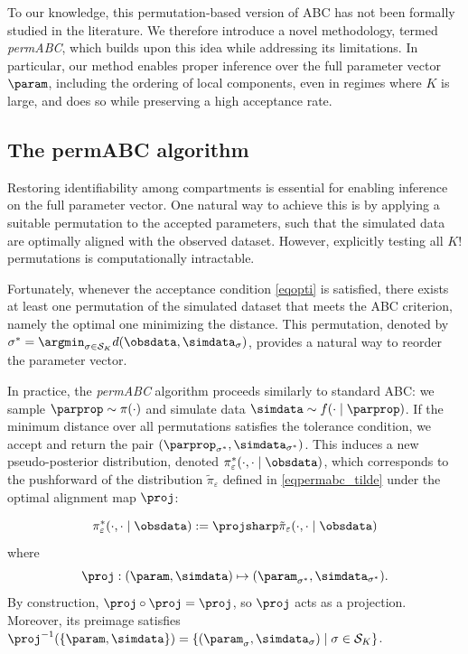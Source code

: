 To our knowledge, this permutation-based version of ABC has not been formally studied in the literature. We therefore introduce a novel methodology, termed \emph{permABC}, which builds upon this idea while addressing its limitations. In particular, our method enables proper inference over the full parameter vector \( \param \), including the ordering of local components, even in regimes where \( K \) is large, and does so while preserving a high acceptance rate.

\subsection{The permABC algorithm}
\label{secpermabc_star}


Restoring identifiability among compartments is essential for enabling inference on the full parameter vector. One natural way to achieve this is by applying a suitable permutation to the accepted parameters, such that the simulated data are optimally aligned with the observed dataset. However, explicitly testing all \( K! \) permutations is computationally intractable.

Fortunately, whenever the acceptance condition \eqref{eqopti} is satisfied, there exists at least one permutation of the simulated dataset that meets the ABC criterion, namely the optimal one minimizing the distance. This permutation, denoted by \( \sigma^* = \argmin_{\sigma \in \mathcal{S}_K} d(\obsdata, \simdata_{\sigma}) \), provides a natural way to reorder the parameter vector.

In practice, the \emph{permABC} algorithm proceeds similarly to standard ABC: we sample \( \parprop \sim \pi(\cdot) \) and simulate data \( \simdata \sim f(\cdot \mid \parprop) \). If the minimum distance over all permutations satisfies the tolerance condition, we accept and return the pair \( (\parprop_{\sigma^*}, \simdata_{\sigma^*}) \). This induces a new pseudo-posterior distribution, denoted \( \pi_{\varepsilon}^*(\cdot, \cdot \mid \obsdata) \), which corresponds to the pushforward of the distribution \( \tilde{\pi}_\varepsilon \) defined in \eqref{eqpermabc_tilde} under the optimal alignment map \( \proj \):

\begin{equation}
\label{eqproj}
\pi^{*}_{\varepsilon}(\cdot, \cdot \mid \obsdata)
:= \projsharp \tilde{\pi}_{\varepsilon}(\cdot, \cdot \mid \obsdata)
\end{equation}
where
\[
\proj: (\param, \simdata) \mapsto (\param_{\sigma^*}, \simdata_{\sigma^*}).
\]
By construction, \( \proj \circ \proj = \proj \), so \( \proj \) acts as a projection. Moreover, its preimage satisfies \( \proj^{-1}(\{\param, \simdata\}) = \{(\param_{\sigma}, \simdata_{\sigma}) \mid \sigma \in \mathcal{S}_K\} \).

